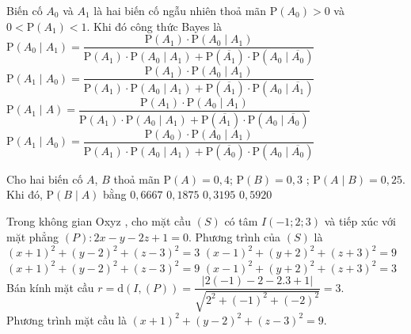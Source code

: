 \begin{ex}%
Biến cố $A_0$ và $A_1$ là hai biến cố ngẫu nhiên thoả mãn $\mathrm{P}(A_0)>0$ và $0<\mathrm{P}(A_1)<1$. Khi đó công thức Bayes là
\choice
{$\mathrm{P}(A_0\mid  A_1)=\dfrac{\mathrm{P}(A_1)\cdot\mathrm{P}(A_0\mid A_1)}{\mathrm{P}(A_1)\cdot\mathrm{P}(A_0\mid A_1)+\mathrm{P}(\overline{A_1})\cdot\mathrm{P}(A_0\mid \overline{A_0})}$}
{\True $\mathrm{P}(A_1\mid A_0)=\dfrac{\mathrm{P}(A_1)\cdot\mathrm{P}(A_0\mid A_1)}{\mathrm{P}(A_1)\cdot\mathrm{P}(A_0\mid A_1)+\mathrm{P}(\overline{A_1})\cdot\mathrm{P}(A_0\mid \overline{A_1})}$}
{$\mathrm{P}(A_1\mid A)=\dfrac{\mathrm{P}(A_1)\cdot\mathrm{P}(A_0\mid A_1)}{\mathrm{P}(A_1)\cdot\mathrm{P}(A_0\mid A_1)+\mathrm{P}(\overline{A_1})\cdot\mathrm{P}(A_0\mid \overline{A_0})}$}
{$\mathrm{P}(A_1\mid A_0)=\dfrac{\mathrm{P}(A_0)\cdot\mathrm{P}(A_0\mid A_1)}{\mathrm{P}(A_1)\cdot\mathrm{P}(A_0\mid A_1)+\mathrm{P}(\overline{A_0})\cdot\mathrm{P}(A_0\mid \overline{A_0})}$}
\end{ex}

\begin{ex}%
Cho hai biến cố $A$, $B$ thoả mãn $\mathrm{P}(A) = 0{,}4$; $\mathrm{P}(B) = 0{,}3$ ; $\mathrm{P}(A\mid B) = 0{,}25$. Khi đó, $\mathrm{P}(B\mid A)$ bằng
\choice
{$0{,}6667$}
{\True $0{,}1875$}
{$0{,}3195$}
{$0{,}5920$}
\end{ex}

\begin{ex}%
Trong không gian Oxyz , cho mặt cầu $\left(S\right)$ có tâm $I\left(-1;2;3\right)$ và tiếp xúc với mặt phẳng $(P):2x-y-2z+1=0$. Phương trình của $\left(S\right)$ là
\choice
{$\left(x+1\right)^{2}+\left(y-2\right)^{2}+\left(z-3\right)^{2}=3$}
{$\left(x{-}1\right)^{2}+\left(y+2\right)^{2}+\left(z+3\right)^{2}=9$}
{\True$\left(x+1\right)^{2}+\left(y-2\right)^{2}+\left(z-3\right)^{2}=9$}
{$\left(x{-}1\right)^{2}+\left(y+2\right)^{2}+\left(z+3\right)^{2}=3$}
\loigiai
{
Bán kính mặt cầu $r=\mathrm{d}\left(I,\left(P\right)\right)=\dfrac{\left|2\left(-1\right)-2-2.3+1\right|}{\sqrt{2^{2}+\left(-1\right)^{2}+\left(-2\right)^{2}}}=3.$\\
Phương trình mặt cầu là $\left(x+1\right)^{2}+\left(y-2\right)^{2}+\left(z-3\right)^{2}=9.$
}
\end{ex}

